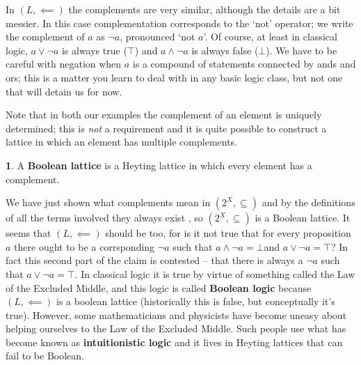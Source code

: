 \documentclass[oneside,english]{amsbook}
\numberwithin{section}{chapter}
\theoremstyle{plain}
\theoremstyle{definition}
\newtheorem{defn}[thm]{\protect\definitionname}
\providecommand{\definitionname}{Definition}
\begin{document}
In $(L,\impliedby)$ the complements are very similar, although the details are a bit messier. In this case complementation corresponds to the `not' operator; we write the complement of $a$ as $\lnot a$, pronounced `not $a$'. Of course, at least in classical logic, $a\lor\lnot a$ is always true ($\top$) and $a\land\lnot a$ is always false ($\bot$). We have to be careful with negation when $a$ is a compound of statements connected by ands and ors; this is a matter you learn to deal with in any basic logic class, but not one that will detain us for now.

Note that in both our examples the complement of an element is uniquely determined; this is \emph{not} a requirement and it is quite possible to construct a lattice in which an element has multiple complements. 

\begin{defn} 
	A \textbf{Boolean lattice} is a Heyting lattice in which every element has a complement. 
\end{defn} 

We have just shown what complements mean in $(2^{X},\subseteq)$ and by the definitions of all the terms involved they always exist , so $(2^{X},\subseteq)$ is a Boolean lattice. It seems that $(L,\impliedby)$ should be too, for is it not true that for every proposition $a$ there ought to be a corrsponding $\lnot a$ such that $a\land\lnot a=\bot$and $a\lor\lnot a=\top$? In fact this second part of the claim is contested -- that there is always a $\lnot a$ such that $a\lor\lnot a=\top$. In classical logic it is true by virtue of something called the Law of the Excluded Middle, and this logic is called \textbf{Boolean logic }because $(L,\impliedby)$ is a boolean lattice (historically this is false, but conceptually it's true). However, some mathematicians and physicists have become uneasy about helping ourselves to the Law of the Excluded Middle. Such people use what has become known as \textbf{intuitionistic logic} and it lives in Heyting lattices that can fail to be Boolean.
\end{document}

